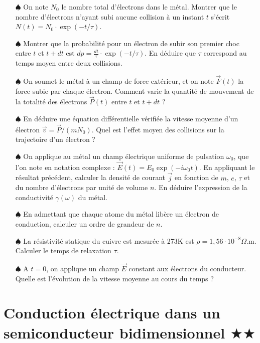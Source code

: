 \documentclass{report}
\begin{document}
\begin{itemize}
	
	\item[$\spadesuit$]	 On note $N_0$ le nombre total d'électrons dans le métal. Montrer que le nombre d'électrons n'ayant subi aucune collision à un instant $t$ s'écrit $N(t)=N_0\cdot\exp(-t/\tau)$.
	
	\item[$\spadesuit$]	 Montrer que la probabilité pour un électron de subir son premier choc entre $t$ et $t+dt$ est $dp=\frac{dt}{\tau}\cdot\exp(-t/\tau)$. En déduire que $\tau$ correspond au temps moyen entre deux collisions.
	
	\item[$\spadesuit$] On soumet le métal à un champ de force extérieur, et on note $\vec{F}(t)$ la force subie par chaque électron. Comment varie la quantité de mouvement de la totalité des électrons $\vec{P}(t)$ entre $t$ et $t+dt$ ?
	
	\item[$\spadesuit$] En déduire une équation différentielle vérifiée la vitesse moyenne d'un électron $\vec{v}=\vec{P}/(mN_0)$. Quel est l'effet moyen des collisions sur la trajectoire d'un électron ?
	
	\item[$\spadesuit$] On applique au métal un champ électrique uniforme de pulsation $\omega_0$, que l'on note en notation complexe : $\vec{E}(t)=E_0\exp(-i\omega_0t)$. En appliquant le résultat précédent, calculer la densité de courant $\vec{j}$ en fonction de $m$, $e$, $\tau$ et du nombre d'électrons par unité de volume $n$. En déduire l'expression de la conductivité $\gamma(\omega)$ du métal.
	
	\item[$\spadesuit$] En admettant que chaque atome du métal libère un électron de conduction, calculer un ordre de grandeur de $n$.
	
	\item[$\spadesuit$] La résistivité statique du cuivre est mesurée à 273K est $\rho=1,56\cdot10^{-8}\Omega$.m. Calculer le temps de relaxation $\tau$. 
	
	\item[$\spadesuit$] A $t=0$, on applique un champ $\vec{E}$ constant aux électrons du conducteur. Quelle est l'évolution de la vitesse moyenne au cours du temps ? 
\end{itemize}

\newpage

\section*{Conduction électrique dans un semiconducteur bidimensionnel $\bigstar\bigstar$}
 
\end{document}

